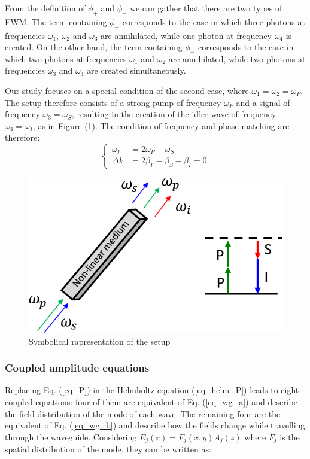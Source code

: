 \documentclass[12pt,a4paper,twoside]{article}
\begin{document}
From the definition of $\phi_+$ and $\phi_-$ we can gather that there are two types of FWM.
The term containing $\phi_+$ corresponds to the case in which three photons at frequencies $\omega_1$, $\omega_2$ and $\omega_3$ are annihilated, while one photon at frequency $\omega_4$ is created.
On the other hand, the term containing $\phi_-$ corresponds to the case in which two photons at frequencies $\omega_1$ and $\omega_2$ are annihilated, while two photons at frequencies $\omega_3$ and $\omega_4$ are created simultaneously.

Our study focuses on a special condition of the second case, where $\omega_1 = \omega_2 = \omega_P$. The setup therefore consists of a strong pump of frequency  $\omega_P$ and a signal of frequency  $\omega_3 = \omega_S$, resulting in the creation of the idler wave of frequency $\omega_4 = \omega_I$, as in Figure (\ref{fig_setup}).
The condition of frequency and phase matching are therefore:
\begin{equation}
\left\{
 	\begin{aligned}
		\omega_I &= 2\omega_P - \omega_S \\
		\Delta k &= 2\beta_P - \beta_S - \beta_I = 0
	\end{aligned}
\right.
\label{eq_f&pmc}
\end{equation} %

\begin{figure}[ht]
	\centering
	\includegraphics[width=.55\textwidth]{setup.png}
	\caption{Symbolical rapresentation of the setup}
	\label{fig_setup}
\end{figure}


\subsubsection{Coupled amplitude equations}

Replacing Eq. (\ref{eq_P}) in the Helmholtz equation (\ref{eq_helm_P}) leads to eight coupled equations: four of them are equivalent of Eq. (\ref{eq_wg_a}) and describe the field distribution of the mode of each wave.
The remaining four are the equivalent of Eq. (\ref{eq_wg_b}) and describe how the fields change while travelling through the waveguide.
Considering $E_j(\textbf{r}) = F_j(x,y)A_j(z)$ where $F_j$ is the spatial distribution of the mode, they can be written as:
\end{document}
